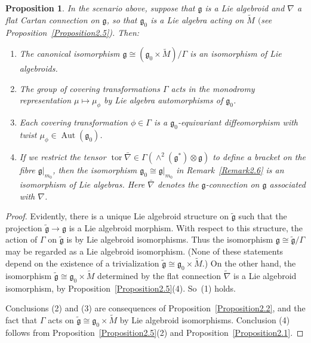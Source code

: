 \documentclass[11pt]{article}
\DeclareMathOperator{\automorphism}{Aut}
\DeclareMathOperator{\torsion}{tor}
\numberwithin{equation}{section}
\newtheorem{PropositionBlaom}[TheoremBlaom]{Proposition}
 { \theoremstyle{definition}
\newtheorem{CounterexampleBlaom}[TheoremBlaom]{Counterexample}
\newtheorem{RemarkBlaom}[TheoremBlaom]{Remark} }
\begin{document}
\begin{PropositionBlaom}\label{Proposition2.6}
  In the scenario above, suppose that $\mathfrak g$ is a Lie algebroid
  and $\nabla$ a flat Cartan connection on $\mathfrak g$, so that
  ${\mathfrak g}_0$ is a Lie algebra acting on $\tilde M$ $($see
  Proposition~{\rm \ref{Proposition2.5})}. Then:
\begin{enumerate}\itemsep=0pt
\item[$(1)$]%
The canonical isomorphism ${\mathfrak g} \cong ({\mathfrak g}_0
  \times \tilde M)/\Gamma$ is an isomorphism of Lie algebroids.
\item[$(2)$]%
The group of covering transformations $\Gamma$ acts in the
  monodromy representation $\mu \mapsto \mu_\phi$ by Lie algebra
  automorphisms of ${\mathfrak g}_0$.
\item[$(3)$]%
Each covering transformation $\phi \in \Gamma $ is a
  ${\mathfrak g}_0 $-equivariant diffeomorphism with twist
  $\mu_\phi\in \automorphism({\mathfrak g}_0)$.
\item[$(4)$]%
If we restrict the tensor $\torsion \bar\nabla \in
  \Gamma(\wedge^2({\mathfrak g}^*)\otimes {\mathfrak g})$ to define a
  bracket on the fibre ${\mathfrak g}|_{m_0}$, then the isomorphism
  ${\mathfrak g}_0\cong {\mathfrak g}|_{m_0}$ in Remark~{\rm \ref{Remark2.6}} is
  an isomorphism of Lie algebras. Here $\bar\nabla $ denotes the
  $\mathfrak g$-connection on $\mathfrak g$ associated with $\nabla$.
\end{enumerate}
\end{PropositionBlaom}

\begin{proof}
  Evidently, there is a unique Lie algebroid structure on $\tilde
  {\mathfrak g}$ such that the projection $\tilde {\mathfrak g}
  \rightarrow {\mathfrak g} $ is a Lie algebroid morphism. With
  respect to this structure, the action of $\Gamma$ on $\tilde
  {\mathfrak g} $ is by Lie algebroid isomorphisms. Thus the
  isomorphism ${\mathfrak g} \cong \tilde {\mathfrak g} / \Gamma $ may
  be regarded as a Lie algebroid isomorphism. (None of these
  statements depend on the existence of a trivialization $\tilde
  {\mathfrak g} \cong {\mathfrak g}_0 \times \tilde M$.) On the other
  hand, the isomorphism $\tilde {\mathfrak g} \cong {\mathfrak g}_0
  \times \tilde M$ determined by the f\/lat connection $\tilde \nabla $
  is a Lie algebroid isomorphism, by Proposition~\ref{Proposition2.5}(4).
   So~(1) holds.

  Conclusions (2) and (3) are consequences of
  Proposition~\ref{Proposition2.2}, %
  and the fact that $\Gamma $ acts on
  $\tilde {\mathfrak g} \cong {\mathfrak g}_0 \times \tilde M$ by Lie
  algebroid isomorphisms. Conclusion (4) follows from
  Proposition~\ref{Proposition2.5}(2) %
  and Proposition~\ref{Proposition2.1}. %
\end{proof}
\end{document}
